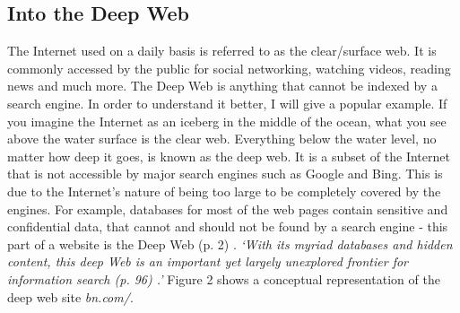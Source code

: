 \documentclass[a4paper, 12pt, titlepage]{article}
\begin{document}
\subsection{Into the Deep Web}
The Internet used on a daily basis is referred to as the clear/surface web. It is commonly accessed by the public for social networking, watching videos, reading news and much more. The Deep Web is anything that cannot be indexed by a search engine. In order to understand it better, I will give a popular example. If you imagine the Internet as an iceberg in the middle of the ocean, what you see above the water surface is the clear web. Everything below the water level, no matter how deep it goes, is known as the deep web. It is a subset of the Internet that is not accessible by major search engines such as Google and Bing. This is due to the Internet's nature of being too large to be completely covered by the engines. For example, databases for most of the web pages contain sensitive and confidential data, that cannot and should not be found by a search engine - this part of a website is the Deep Web (p. 2) \cite{InsideDW}. \textit{`With its myriad databases and hidden content, this deep Web is an important yet largely unexplored frontier for information search (p. 96) \cite{Access}.'} Figure 2 shows a conceptual representation of the deep web site \textit{bn.com/}. \\[6pt]
\end{document}
